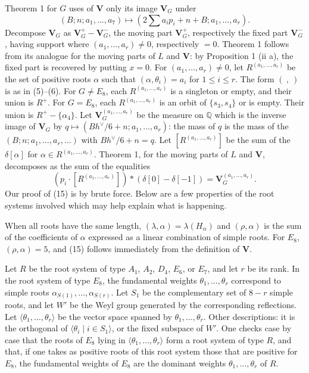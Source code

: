 \documentclass[11pt,a4paper]{article}
\theoremstyle{plain}
\theoremstyle{definition}
\begin{document}
Theorem 1 for $G$ uses of $\mathbf V$ only its image $\mathbf V_G$ under
\begin{equation}\label{eq:14}
(B;n;a_1,\ldots,a_7)\mapsto \left(2\sum a_i p_i+n+B; a_1,\ldots,a_r\right).
\end{equation}
Decompose $\mathbf V_G$ as $\mathbf V_G^+-\mathbf V_G^-$, the moving part $\mathbf V_G^+$, respectively the fixed part $\mathbf V_G^-$, having support where $(a_1,\ldots,a_r)\neq0$, respectively $=0$. Theorem 1 follows from its analogue for the moving parts of $L$ and $\mathbf V$: by Proposition 1 (ii a), the fixed part is recovered by putting $x=0$. For $(a_1,\ldots,a_r)\neq0$, let $R^{(a_1,\ldots,a_r)}$ be the set of positive roots $\alpha$ such that $(\alpha,\theta_i)=a_i$ for $1\leq i\leq r$. The form $(\ ,\ )$ is as in (5)--(6). For $G\neq E_8$, each $R^{(a_1,\ldots,a_r)}$ is a singleton or empty, and their union is $R^+$. For $G=E_8$, each $R^{(a_1,\ldots,a_r)}$ is an orbit of $\{s_3,s_4\}$ or is empty. Their union is $R^+-\{\alpha_4\}$. Let $\mathbf V_G^{(a_1,\ldots,a_r)}$ be the measure on $\mathbb Q$ which is the inverse image of $\mathbf V_G$ by $q\mapsto(Bh^\vee/6+n;a_1,\ldots,a_r)$: the mass of $q$ is the mass of the $(B;n;a_1,\ldots,a_r,\ldots)$ with $Bh^\vee/6+n=q$. Let $[R^{(a_1,\ldots,a_r)}]$ be the sum of the $\delta[\alpha]$ for $\alpha\in R^{(a_1,\ldots,a_r)}$. Theorem 1, for the moving parts of $L$ and $\mathbf V$, decomposes as the sum of the equalities
\begin{equation}\label{eq:15}
(p_i\cdot [R^{(a_1,\ldots,a_r)}])*(\delta[0]-\delta[-1])=\mathbf V_G^{(a_1,\ldots,a_r)}.
\end{equation}
Our proof of (15) is by brute force. Below are a few properties of the root systems involved which may help explain what is happening.

When all roots have the same length, $(\lambda,\alpha)=\lambda(H_\alpha)$ and $(\rho,\alpha)$ is the sum of the coefficients of $\alpha$ expressed as a linear combination of simple roots. For $E_8$, $(\rho,\alpha)=5$, and (15) follows immediately from the definition of $\mathbf V$.

Let $R$ be the root system of type $A_1$, $A_2$, $D_4$, $E_6$, or $E_7$, and let $r$ be its rank. In the root system of type $E_8$, the fundamental weights $\theta_1,\ldots,\theta_r$ correspond to simple roots $\alpha_{S(1)},\ldots,\alpha_{S(r)}$. Let $S_1$ be the complementary set of $8-r$ simple roots, and let $W'$ be the Weyl group generated by the corresponding reflections. Let $\langle\theta_1,\ldots,\theta_r\rangle$ be the vector space spanned by $\theta_1,\ldots,\theta_r$. Other descriptions: it is the orthogonal of $\langle\theta_i\mid i\in S_1\rangle$, or the fixed subspace of $W'$. One checks case by case that the roots of $E_8$ lying in $\langle\theta_1,\ldots,\theta_r\rangle$ form a root system of type $R$, and that, if one takes as positive roots of this root system those that are positive for $E_8$, the fundamental weights of $E_8$ are the dominant weights $\theta_1,\ldots,\theta_r$ of $R$.
\end{document}
